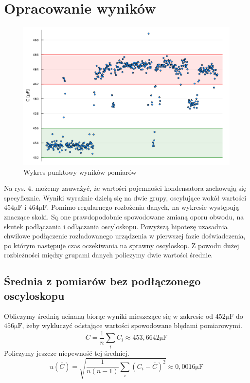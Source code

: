 \documentclass[12pt]{mwart}
\begin{document}
	\section{Opracowanie wyników}
	\begin{figure}[H]
		\begin{center}
			\includegraphics[scale=0.35]{scatter1.png}
			\caption{Wykres punktowy wyników pomiarów}
		\end{center}
	\end{figure}
	\noindent Na rys. 4. możemy zauważyć, że wartości pojemności kondensatora zachowują się specyficznie. Wyniki wyraźnie dzielą się na dwie grupy, oscylujące wokół wartości $454\mathrm{\mu F}$ i $464\mathrm{\mu F}$. Pomimo regularnego rozłożenia danych, na wykresie występują znaczące skoki. Są one prawdopodobnie spowodowane zmianą oporu obwodu, na skutek podłączania i odłączania oscyloskopu. Powyższą hipotezę uzasadnia chwilowe podłączenie rozładowanego urządzenia w pierwszej fazie doświadczenia, po którym następuje czas oczekiwania na sprawny oscyloskop. Z powodu dużej rozbieżności między grupami danych policzymy dwie wartości średnie.
	
	\subsection{Średnia z pomiarów bez podłączonego oscyloskopu}
	\noindent Obliczymy średnią ucinaną biorąc wyniki mieszczące się w zakresie od $452\mathrm{\mu F}$ do $456\mathrm{\mu F}$, żeby wykluczyć odstające wartości spowodowane błędami pomiarowymi.
	$$ \bar{C} = \frac{1}{n}\sum_{i}C_i \approx 453,6642\mathrm{\mu F} $$
	Policzymy jeszcze niepewność tej średniej.
	$$ u(\bar{C}) = \sqrt{ \frac{1}{n(n - 1)} \sum_{i}(C_i - \bar{C})^2 } \approx 0,0016\mathrm{\mu F} $$
	
\end{document}
